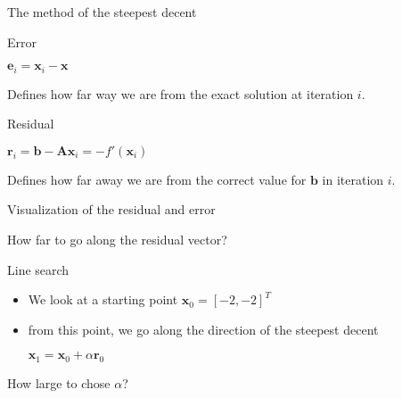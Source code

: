 \documentclass[12pt,t]{beamer}
\begin{document}
\begin{frame}{The method of the steepest decent}

\begin{block}{Error}
\begin{center}
$\mathbf{e}_i = \mathbf{x}_i - \mathbf{x}$
\end{center}
Defines how far way we are from the exact solution at iteration $i$.
\end{block}

\begin{block}{Residual}
\begin{center}
$\mathbf{r}_i = \mathbf{b} - \mathbf{A}\mathbf{x}_i= -f'(\mathbf{x}_i)$
\end{center}
Defines how far away we are from the correct value for $\mathbf{b}$ in iteration $i$. 
\end{block}

\end{frame}


\begin{frame}{Visualization of the residual and error}
\begin{center}
\end{center}
\begin{center}
How far to go along the residual vector?
\end{center}
\end{frame}


\begin{frame}{Line search}

\begin{itemize}
\item We look at a starting point $\mathbf{x}_0=[-2,-2]^T$
\item from this point, we go along the direction of the steepest decent
\begin{center}
$\mathbf{x}_1 = \mathbf{x}_0 + \alpha \mathbf{r}_0$
\end{center}
\end{itemize}
How large to chose $\alpha$?
\end{frame}
\end{document}
